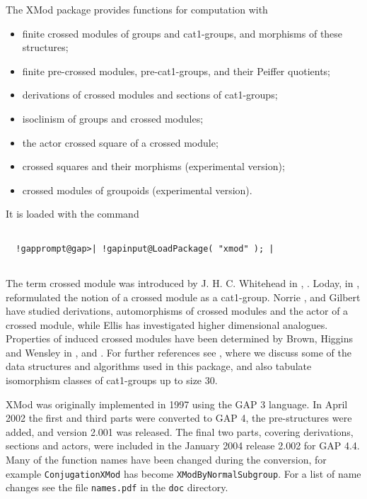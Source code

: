 \documentclass[a4paper,11pt]{report}
\begin{document}
{
  The \textsf{XMod} package provides functions for computation with 
\begin{itemize}
\item  finite crossed modules of groups and cat1-groups, and morphisms of these
structures; 
\item  finite pre-crossed modules, pre-cat1-groups, and their Peiffer quotients; 
\item  derivations of crossed modules and sections of cat1-groups; 
\item  isoclinism of groups and crossed modules; 
\item  the actor crossed square of a crossed module; 
\item  crossed squares and their morphisms (experimental version); 
\item  crossed modules of groupoids (experimental version). 
\end{itemize}
 It is loaded with the command 
\begin{Verbatim}[commandchars=!@|,fontsize=\small,frame=single,label=Example]
  
  !gapprompt@gap>| !gapinput@LoadPackage( "xmod" ); |
  
\end{Verbatim}
 

 The term crossed module was introduced by J. H. C. Whitehead in \cite{W2}, \cite{W1}. Loday, in \cite{L1}, reformulated the notion of a crossed module as a cat1-group. Norrie \cite{N1}, \cite{N2} and Gilbert \cite{G1} have studied derivations, automorphisms of crossed modules and the actor of a
crossed module, while Ellis \cite{E1} has investigated higher dimensional analogues. Properties of induced crossed
modules have been determined by Brown, Higgins and Wensley in \cite{BH1}, \cite{BW1} and \cite{BW2}. For further references see \cite{AW1}, where we discuss some of the data structures and algorithms used in this
package, and also tabulate isomorphism classes of cat1-groups up to size $30$. 

 \textsf{XMod} was originally implemented in 1997 using the \textsf{GAP} 3 language. In April 2002 the first and third parts were converted to \textsf{GAP} 4, the pre-structures were added, and version 2.001 was released. The final
two parts, covering derivations, sections and actors, were included in the
January 2004 release 2.002 for \textsf{GAP} 4.4. Many of the function names have been changed during the conversion, for
example \texttt{ConjugationXMod} has become \texttt{XModByNormalSubgroup}. For a list of name changes see the file \texttt{names.pdf} in the \texttt{doc} directory. 

}
\end{document}
